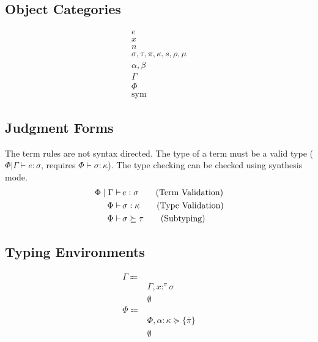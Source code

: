 \documentclass {article}
\begin{document}
\subsection{Object Categories}

\begin{align*}
e \tag{Terms} \\
x \tag{Variables} \\
n \tag{Numbers} \\
\sigma, \tau, \pi, \kappa, s, \rho, \mu \tag{Types, Kinds, and Sorts} \\
\alpha, \beta \tag{Type and Kind Variables} \\
\Gamma \tag{Type Environment} \\
\Phi \tag{Misc Environment} \\
\text{sym} \tag{Symbol}
\end{align*}


\subsection{Judgment Forms}
The term rules are not syntax directed.
The type of a term must be a valid type ($ \Phi | \Gamma \vdash e : \sigma $, requires $ \Phi \vdash \sigma : \kappa $).
The type checking can be checked using synthesis mode.
\begin{align*}
\Phi \mid \Gamma \vdash \, & e : \sigma \tag{\text{Term Validation}} \\
\Phi \vdash \, & \sigma : \kappa \tag{\text{Type Validation}} \\
\Phi \vdash \, & \sigma \succeq \tau \tag{Subtyping}
\end{align*}

\subsection{Typing Environments}
\begin{align*}
\Gamma \Coloneqq & \\
& \Gamma, x :^\pi \sigma \\
& \emptyset \\
\Phi \Coloneqq & \\
& \Phi, \alpha : \kappa \succeq \{ \overline \pi \} \\
& \emptyset \\
\end{align*}
\end{document}
